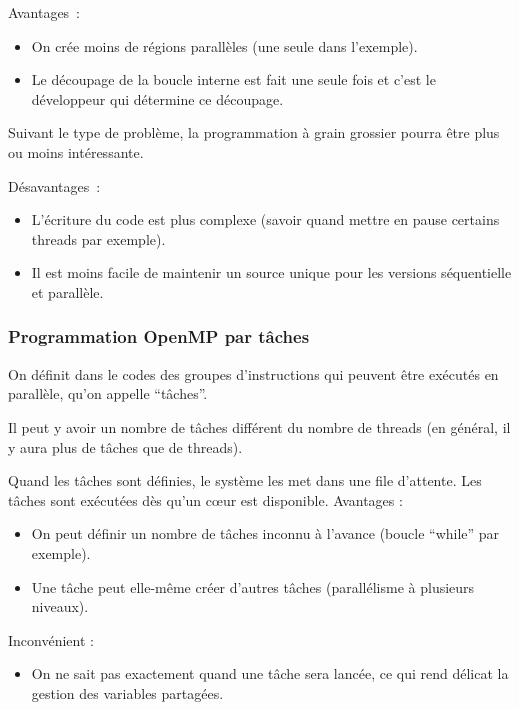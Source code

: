\documentclass{beamer}
\begin{document}
\begin{frame}
    \vfill
	Avantages~:
	\begin{itemize}
		\item On crée moins de régions parallèles (une seule dans l'exemple).
		\item Le découpage de la boucle interne est fait une seule fois et c'est le développeur qui détermine ce découpage.
	\end{itemize}

    \vfill
    Suivant le type de problème, la programmation à grain grossier pourra être plus ou moins intéressante.
    
    \vfill
	Désavantages~:
    \begin{itemize}
    	\item L'écriture du code est plus complexe (savoir quand mettre en pause certains threads par exemple).
    	\item Il est moins facile de maintenir un source unique pour les versions séquentielle et parallèle.
   \end{itemize} 
    \vfill
    
\end{frame}

\begin{frame}[fragile]
	\frametitle{Programmation OpenMP par tâches}

On définit dans le codes des groupes d'instructions qui peuvent être exécutés en parallèle, qu'on appelle ``tâches''. 
\vfill

Il peut y avoir un nombre de tâches différent du nombre de threads (en général, il y aura plus de tâches que de threads).
\vfill
 
Quand les tâches sont définies, le système les met dans une file d'attente. Les tâches sont exécutées dès qu'un c\oe ur est disponible.
\vfill
Avantages : 
\begin{itemize}
	\item On peut définir un nombre de tâches inconnu à l'avance (boucle ``while'' par exemple).
	\item Une tâche peut elle-même créer d'autres tâches (parallélisme à plusieurs niveaux).
\end{itemize}
Inconvénient : 
\begin{itemize}
	\item On ne sait pas exactement quand une tâche sera lancée, ce qui rend délicat la gestion des variables partagées.
\end{itemize}
\end{frame}
\end{document}
